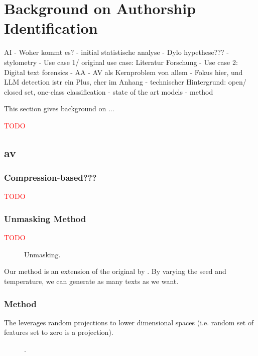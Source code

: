 \chapter{Background on Authorship Identification}
\label{chap:authorship_identification}
   AI
    - Woher kommt es?
        - initial statistische analyse
        - Dylo hypethese???
        - stylometry
        - Use case 1/ original use case: Literatur Forschung
        - Use case 2: Digital text forensics
    - AA
    - AV als Kernproblem von allem
        - Fokus hier, und LLM detection istr ein Plus, eher im Anhang
    - technischer Hintergrund: open/ closed set, one-class classification
    - state of the art models
    - \imp{} method

This section gives background on ...

\textcolor{red}{TODO}






\section{\acl{av}}

\subsection{Compression-based???}
\textcolor{red}{TODO}


\subsection{Unmasking Method}
\textcolor{red}{TODO}


\begin{figure}[htbp]
    \centering
    
    \caption{Unmasking.}
    \label{fig:unmasking}
\end{figure}
Our method is an extension of the original \impAppr{} by \citet{koppel_determining_2014}.
By varying the seed and temperature, we can generate as many texts as we want.
  
\subsection{\imp{} Method}
\label{sec:impostor_method_theory}

The \impAppr{} leverages random projections to lower dimensional spaces (i.e. random set of features set to zero is a projection).
\begin{figure}[htbp]
    \centering
    
    \caption{\imp{}.}
    \label{fig:impostor}
\end{figure}


